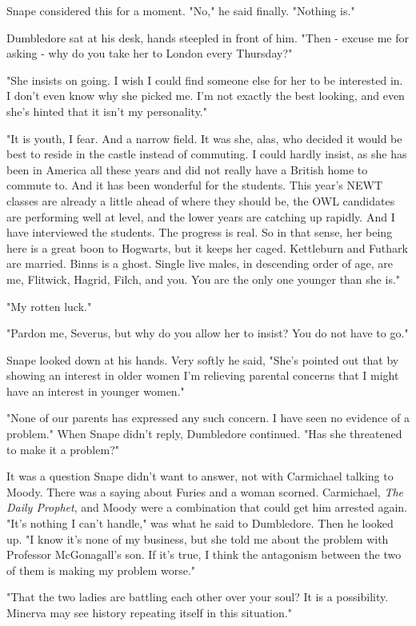 Snape considered this for a moment. "No," he said finally. "Nothing is."

Dumbledore sat at his desk, hands steepled in front of him. "Then - excuse me for asking - why do you take her to London every Thursday?"

"She insists on going. I wish I could find someone else for her to be interested in. I don't even know why she picked me. I'm not exactly the best looking, and even she's hinted that it isn't my personality."

"It is youth, I fear. And a narrow field. It was she, alas, who decided it would be best to reside in the castle instead of commuting. I could hardly insist, as she has been in America all these years and did not really have a British home to commute to. And it has been wonderful for the students. This year's NEWT classes are already a little ahead of where they should be, the OWL candidates are performing well at level, and the lower years are catching up rapidly. And I have interviewed the students. The progress is real. So in that sense, her being here is a great boon to Hogwarts, but it keeps her caged. Kettleburn and Futhark are married. Binns is a ghost. Single live males, in descending order of age, are me, Flitwick, Hagrid, Filch, and you. You are the only one younger than she is."

"My rotten luck."

"Pardon me, Severus, but why do you allow her to insist? You do not have to go."

Snape looked down at his hands. Very softly he said, "She's pointed out that by showing an interest in older women I'm relieving parental concerns that I might have an interest in{\el} younger women."

"None of our parents has expressed any such concern. I have seen no evidence of a problem." When Snape didn't reply, Dumbledore continued. "Has she threatened to make it a problem?"

It was a question Snape didn't want to answer, not with Carmichael talking to Moody. There was a saying about Furies and a woman scorned. Carmichael, \emph{The Daily Prophet}, and Moody were a combination that could get him arrested again. "It's nothing I can't handle," was what he said to Dumbledore. Then he looked up. "I know it's none of my business, but she told me about the problem with Professor McGonagall's son. If it's true, I think the antagonism between the two of them is making my problem worse."

"That the two ladies are battling each other over your soul? It is a possibility. Minerva may see history repeating itself in this situation."

